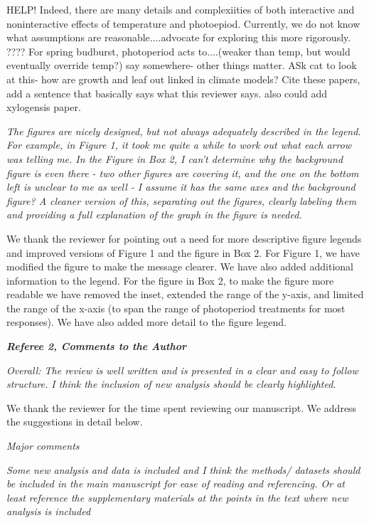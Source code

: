 \documentclass{article}
\begin{document}
\par  HELP! Indeed, there are many details and complexiities of both interactive and noninteractive effects of temperature and photoepiod. 
Currently, we do not know what assumptions are reasonable....advocate for exploring this more rigorously. 
???? For spring budburst, photoperiod acts to....(weaker than temp, but would eventually override temp?)
say somewhere- other things matter. 
ASk cat to look at this- how are growth and leaf out linked in climate models?
Cite these papers, add a sentence that basically says what this reviewer says. also could add xylogensis paper. 


\par \emph{The figures are nicely designed, but not always adequately described in the legend. For example, in Figure 1, it took me quite a while to work out what each arrow was telling me. In the Figure in Box 2, I can't determine why the background figure is even there - two other figures are covering it, and the one on the bottom left is unclear to me as well - I assume it has the same axes and the background figure? A cleaner version of this, separating out the figures, clearly labeling them and providing a full explanation of the graph in the figure is needed.}

\par We thank the reviewer for pointing out a need for more descriptive figure legends and improved versions of Figure 1 and the figure in Box 2.
For Figure 1, we have modified the figure to make the message clearer. We have also added additional information to the legend.
For the figure in Box 2,  to make the figure more readable we have removed the inset, extended the range of the y-axis, and limited the range of the x-axis (to span the range of photoperiod treatments for most responses). We have also added more detail to the figure legend.


\emph{{\bf Referee 2, Comments to the Author}}
\par \emph{Overall: The review is well written and is presented in a clear and easy to follow structure. I think the inclusion of new analysis should be clearly highlighted.}

\par We thank the reviewer for the time spent reviewing our manuscript. We address the suggestions in detail below. 

\par \emph{Major comments}
\par \emph{Some new analysis and data is included and I think the methods/ datasets should be included in the main manuscript for ease of reading and referencing. Or at least reference the supplementary materials at the points in the text where new analysis is included}
\end{document}
